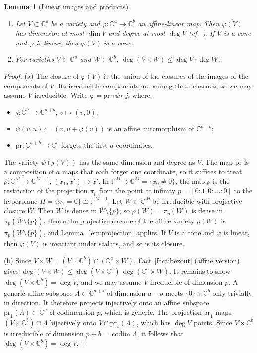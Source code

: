 \documentclass[11pt]{article}
\newtheorem{lemma}[theorem]{Lemma}
\theoremstyle{definition}
\numberwithin{equation}{section}
\newcommand{\C}{\mathbb{C}}
\newcommand{\PP}{\mathbb{P}}
\DeclareMathOperator{\codim}{codim}
\begin{document}
\begin{lemma}[Linear images and products]\label{lem:linear}
\begin{enumerate}
\item[(a)] Let $V\subset\C^a$ be a variety and $\varphi:\C^a\to\C^b$ an affine-linear map. Then $\overline{\varphi(V)}$ has dimension at most $\dim V$ and degree at most $\deg V$ (cf.\ \cite{Heintz}). If $V$ is a cone and $\varphi$ is linear, then $\overline{\varphi(V)}$ is a cone.
\item[(b)] For varieties $V\subset\C^a$ and $W\subset\C^b$, $\deg(V\times W)\le\deg V\cdot\deg W$.
\end{enumerate}
\end{lemma}

\begin{proof}
(a) The closure of $\varphi(V)$ is the union of the closures of the images of the components of $V$. Its irreducible components are among these closures, so we may assume $V$ irreducible. Write $\varphi=\mathrm{pr}\circ\psi\circ j$, where:
\begin{itemize}
\item $j:\C^a\to\C^{a+b}$, $v\mapsto(v,0)$;
\item $\psi(v,u):=(v,u+\varphi(v))$ is an affine automorphism of $\C^{a+b}$;
\item $\mathrm{pr}:\C^{a+b}\to\C^b$ forgets the first $a$ coordinates.
\end{itemize}
The variety $\psi(j(V))$ has the same dimension and degree as $V$. The map $\mathrm{pr}$ is a composition of $a$ maps that each forget one coordinate, so it suffices to treat $\rho:\C^M\to\C^{M-1}$, $(x_1,x')\mapsto x'$. In $\PP^M\supset\C^M=\{x_0\neq0\}$, the map $\rho$ is the restriction of the projection $\pi_p$ from the point at infinity $p=[0:1:0:\dots:0]$ to the hyperplane $\Pi=\{x_1=0\}\cong\PP^{M-1}$. Let $W\subset\C^M$ be irreducible with projective closure $\overline W$. Then $W$ is dense in $\overline W\setminus\{p\}$, so $\rho(W)=\pi_p(W)$ is dense in $\pi_p(\overline W\setminus\{p\})$. Hence the projective closure of the affine variety $\overline{\rho(W)}$ is $\overline{\pi_p(\overline W\setminus\{p\})}$, and Lemma~\ref{lem:projection} applies. If $V$ is a cone and $\varphi$ is linear, then $\varphi(V)$ is invariant under scalars, and so is its closure.

(b) Since $V\times W=(V\times\C^b)\cap(\C^a\times W)$, Fact~\ref{fact:bezout} (affine version) gives $\deg(V\times W)\le\deg(V\times\C^b)\,\deg(\C^a\times W)$. It remains to show $\deg(V\times\C^b)=\deg V$, and we may assume $V$ irreducible of dimension $p$. A generic affine subspace $\Lambda\subset\C^{a+b}$ of dimension $a-p$ meets $\{0\}\times\C^b$ only trivially in direction. It therefore projects injectively onto an affine subspace $\mathrm{pr}_1(\Lambda)\subset\C^a$ of codimension $p$, which is generic. The projection $\mathrm{pr}_1$ maps $(V\times\C^b)\cap\Lambda$ bijectively onto $V\cap\mathrm{pr}_1(\Lambda)$, which has $\deg V$ points. Since $V\times\C^b$ is irreducible of dimension $p+b=\codim\Lambda$, it follows that $\deg(V\times\C^b)=\deg V$.
\end{proof}
\end{document}

